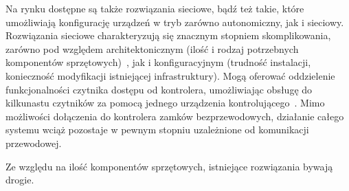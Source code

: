 		Na rynku dostępne są także rozwiązania sieciowe, bądź też takie, które umożliwiają konfigurację urządzeń w tryb zarówno autonomiczny, jak i sieciowy. Rozwiązania sieciowe charakteryzują się znacznym stopniem skomplikowania, zarówno pod względem architektonicznym (ilość i rodzaj potrzebnych komponentów sprzętowych)~\cite{racs5}, jak i konfiguracyjnym (trudność instalacji, konieczność modyfikacji istniejącej infrastruktury). Mogą oferować oddzielenie funkcjonalności czytnika dostępu od kontrolera, umożliwiając obsługę do kilkunastu czytników za pomocą jednego urządzenia kontrolującego~\cite{racs5}. Mimo możliwości dołączenia do kontrolera zamków bezprzewodowych, działanie całego systemu wciąż pozostaje w pewnym stopniu uzależnione od komunikacji przewodowej.

		Ze względu na ilość komponentów sprzętowych, istniejące rozwiązania bywają drogie.